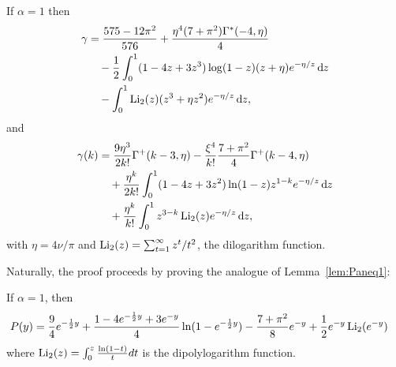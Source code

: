 \begin{proposition}\label{prop:gammaais1}
If $\alpha=1$ then 
\begin{align*} 
\gamma &= \frac{575 - 12 \pi^2}{576} + \frac{\eta^4(7 + \pi^2)\Gamma^\ast(-4, \eta)}{4}\\
 	&\hspace{10pt}- \frac{1}{2} \int_0^1 (1 - 4z + 3z^3)\log(1-z)(z + \eta)e^{-\eta/z} \operatorname{\mathrm{d}\hspace{-2pt}} z\\
 	&\hspace{10pt}- \int_0^1 \operatorname{Li}_2(z)(z^3 + \eta z^2) e^{-\eta/z} \operatorname{\mathrm{d}\hspace{-2pt}} z,		
 \end{align*}
and
\begin{align*}
 \gamma(k) &= \frac{9 \eta^3}{2 k!} \Gamma^+(k-3,\eta)-\frac{\xi^4}{k!}\frac{7+\pi^2}{4}\Gamma^+(k-4,\eta)\\
 	&\hspace{10pt}+ \frac{\eta^k}{2k!}\int_0^1 (1-4z+3z^2)\ln(1-z)z^{1-k}e^{-\eta/z}\operatorname{\mathrm{d}\hspace{-2pt}} z\\ 
 	&\hspace{10pt}+ \frac{\eta^k}{k!}\int_0^1 z^{3-k} \operatorname{Li}_2(z) e^{-\eta/z} \operatorname{\mathrm{d}\hspace{-2pt}} z,
 \end{align*}
 with $\eta = 4\nu/\pi$ and $\operatorname{Li}_2(z) = \sum_{t = 1}^\infty z^t/t^2$, the dilogarithm 
 function.
\end{proposition}


Naturally, the proof proceeds by proving the analogue of Lemma~\ref{lem:Paneq1}:


\begin{lemma}\label{lem:Pais1}
If $\alpha = 1$, then
	\begin{align*}
	&P(y) =\frac{9}{4} e^{-\frac{1}{2}y} + \frac{1 - 4 e^{-\frac{1}{2}y} + 3 e^{-y}}{4}\ln(1 - e^{-\frac{1}{2}y}) - \frac{7+\pi^2}{8}
e^{-y}  + 
\frac{1}{2}e^{-y}\operatorname{Li}_2(e^{-y})
	\end{align*}
	where $\operatorname{Li}_2(z)=\int_0^z \frac{\ln(1-t)}{t}dt$ is the dipolylogarithm function.
\end{lemma}


